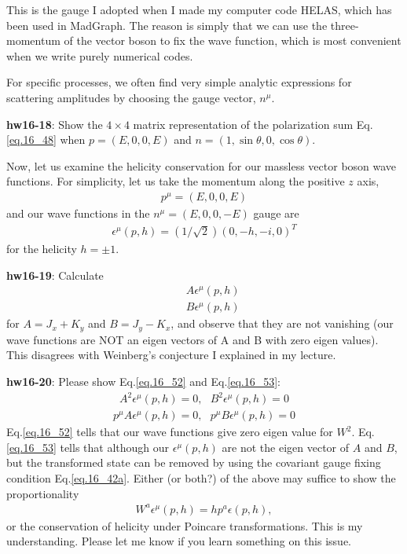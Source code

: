 \documentclass[12pt]{article}
\def\eps{\epsilon}
\begin{document}
This is the gauge I adopted when I made my computer code HELAS, which
has been used in MadGraph. The reason is simply that we can use the
three-momentum of the vector boson to fix the wave function, which is
most convenient when we write purely numerical codes.

For specific processes, we often find very simple analytic expressions
for scattering amplitudes by choosing the gauge vector, $n^\mu$.

{\bf hw16-18}: Show the $4\times 4$ matrix representation of the polarization
sum Eq.\ref{eq.16_48} when $p=(E,0,0,E)$ and $n=(1,\sin\theta,0,\cos\theta)$.

Now, let us examine the helicity conservation for our massless vector
boson wave functions. For simplicity, let us take the momentum along
the positive $z$ axis,
\begin{eqnarray}
  p^\mu = (E, 0, 0, E) \label{eq.16_49}
\end{eqnarray}
and our wave functions in the $n^\mu = (E, 0, 0, -E)$ gauge are
\begin{eqnarray}
  \eps^\mu(p,h) = (1/\sqrt{2}) (0, -h, -i, 0)^T \label{eq.16_50}
\end{eqnarray}
for the helicity $h=\pm 1$.

{\bf hw16-19}: Calculate
\begin{eqnarray}
  && A \eps^\mu(p,h) \label{eq.16_51a}\\
  && B \eps^\mu(p,h) \label{eq.16_51b}
\end{eqnarray}
for $A = J_x + K_y$ and $B = J_y - K_x$, and observe that they
are not vanishing (our wave functions are NOT an eigen
vectors of A and B with zero eigen values). This disagrees
with Weinberg's conjecture I explained in my lecture.

{\bf hw16-20}: Please show Eq.\ref{eq.16_52} and Eq.\ref{eq.16_53}:
\begin{eqnarray}
  A^2 \eps^\mu(p,h) = 0,~~~B^2 \eps^\mu(p,h) = 0 \label{eq.16_52}
\end{eqnarray}
\begin{eqnarray}
  p^\mu A \eps^\mu(p,h) = 0,~~~ p^\mu B \eps^\mu(p,h) = 0 \label{eq.16_53}
\end{eqnarray}
Eq.\ref{eq.16_52} tells that our wave functions give zero eigen value for $W^2$. Eq.\ref{eq.16_53} tells that although our $\eps^\mu(p,h)$ are not the eigen vector of $A$ and $B$, but the transformed state can be removed by using the covariant gauge fixing condition Eq.\ref{eq.16_42a}. Either (or both?) of the above may suffice to show the proportionality
\begin{eqnarray}
  W^a \eps^\mu(p,h) = h p^a \eps(p,h), \label{eq.16_54}
\end{eqnarray}
or the conservation of helicity under Poincare transformations.
This is my understanding.  Please let me know if you learn something
on this issue.
\end{document}
